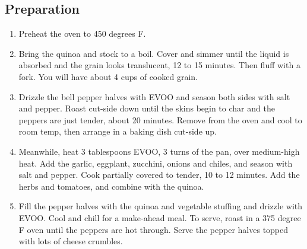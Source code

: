 \subsection{Preparation}
\begin{enumerate}
    \item Preheat the oven to 450 degrees F.
    \item Bring the quinoa and stock to a boil. Cover and simmer until the liquid is absorbed and the grain looks translucent, 12 to 15 minutes. Then fluff with a fork. You will have about 4 cups of cooked grain.
    \item Drizzle the bell pepper halves with EVOO and season both sides with salt and pepper. Roast cut-side down until the skins begin to char and the peppers are just tender, about 20 minutes. Remove from the oven and cool to room temp, then arrange in a baking dish cut-side up.
    \item Meanwhile, heat 3 tablespoons EVOO, 3 turns of the pan, over medium-high heat. Add the garlic, eggplant, zucchini, onions and chiles, and season with salt and pepper. Cook partially covered to tender, 10 to 12 minutes. Add the herbs and tomatoes, and combine with the quinoa.
    \item Fill the pepper halves with the quinoa and vegetable stuffing and drizzle with EVOO. Cool and chill for a make-ahead meal. To serve, roast in a 375 degree F oven until the peppers are hot through. Serve the pepper halves topped with lots of cheese crumbles.
\end{enumerate}
